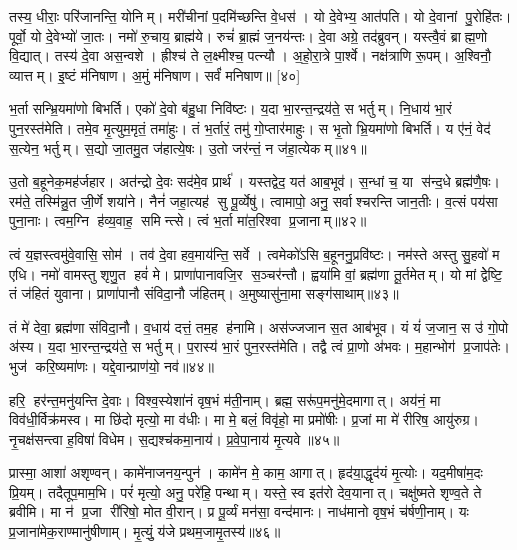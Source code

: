 तस्य॒ धीराः॒ परि॑जानन्ति॒ योनिम्। मरी॑चीनां प॒दमि॑च्छन्ति वे॒धस॑। यो दे॒वेभ्य॒ आत॑पति। यो दे॒वानां पु॒रोहि॑तः। पूर्वो॒ यो दे॒वेभ्यो॑ जा॒तः। नमो॑ रु॒चाय॒ ब्राह्म॑ये। रुचं॑ ब्रा॒ह्मं ज॒नय॑न्तः। दे॒वा अग्रे॒ तद॑ब्रुवन्। यस्त्वै॒वं ब्राह्म॒णो वि॒द्यात्। तस्य॑ दे॒वा अस॒न्वशे। ह्रीश्च॑ ते ल॒क्ष्मीश्च॒ पत्न्यौ। अ॒हो॒रा॒त्रे पा॒र्श्वे। नक्ष॑त्राणि रू॒पम्। अ॒श्विनौ॒ व्यात्तम्। इ॒ष्टं म॑निषाण। अ॒मुं म॑निषाण। सर्वं॑ मनिषाण॥ [४०]
\anuvakamend[जा॒य॒ते॒ वशे॑ स॒प्त च॑]

भ॒र्ता सन्भ्रि॒यमा॑णो बिभर्ति। एको॑ दे॒वो ब॑हु॒धा निवि॑ष्टः। य॒दा भा॒रन्त॒न्द्रय॑ते॒ स भर्तुम्। नि॒धाय॑ भा॒रं पुन॒रस्त॑मेति। तमे॒व मृ॒त्युम॒मृतं॒ तमा॑हुः। तं भ॒र्तारं॒ तमु॑ गो॒प्तार॑माहुः। स भृ॒तो भ्रि॒यमा॑णो बिभर्ति। य ए॑नं॒ वेद॑ स॒त्येन॒ भर्तुम्। स॒द्यो जा॒तमु॒त ज॑हात्ये॒षः। उ॒तो जर॑न्तं॒ न ज॑हा॒त्येकम्॥४१॥

उ॒तो ब॒हूनेक॒मह॑र्जहार। अत॑न्द्रो दे॒वः सद॑मे॒व प्रार्थ॑। यस्तद्वेद॒ यत॑ आब॒भूव॑। स॒न्धां च॒ या स॑न्द॒धे ब्रह्म॑णै॒षः। रम॑ते॒ तस्मि॑न्नु॒त जी॒र्णे शया॑ने। नैनं॑ जहा॒त्यह॑ सु पू॒र्व्येषु॑। त्वामापो॒ अनु॒ सर्वाश्चरन्ति जान॒तीः। व॒त्सं पय॑सा पुना॒नाः। त्वम॒ग्नि ह॑व्य॒वाह॒ समिन्त्से। त्वं भ॒र्ता मा॑त॒रिश्वा प्र॒जानाम्॥४२॥

त्वं य॒ज्ञस्त्वमु॑वे॒वासि॒ सोम॑। तव॑ दे॒वा हव॒माय॑न्ति॒ सर्वे। त्वमेको॑ऽसि ब॒हूननु॒प्रवि॑ष्टः। नम॑स्ते अस्तु सु॒हवो॑ म एधि। नमो॑ वामस्तु शृणु॒त हवं॑ मे। प्राणा॑पानावजि॒र स॒ञ्चर॑न्तौ। ह्वया॑मि वां॒ ब्रह्म॑णा तू॒र्तमेतम्। यो मां द्वेेष्टि॒ तं ज॑हितं युवाना। प्राणा॑पानौ संविदा॒नौ ज॑हितम्। अ॒मुष्यासु॑ना॒मा सङ्ग॑साथाम्॥४३॥

तं मे॑ देवा॒ ब्रह्म॑णा संविदा॒नौ। व॒धाय॑ दत्तं॒ तम॒ह ह॑नामि। अस॑ज्जजान स॒त आब॑भूव। यं यं॑ ज॒जान॒ स उ॑ गो॒पो अ॑स्य। य॒दा भा॒रन्त॒न्द्रय॑ते॒ स भर्तुम्। प॒रास्य॑ भा॒रं पुन॒रस्त॑मेति। तद्वै त्वं प्रा॒णो अ॑भवः। म॒हान्भोग॑ प्र॒जाप॑तेः। भुज॑ करि॒ष्यमा॑णः। यद्दे॒वान्प्राण॑यो॒ नव॑॥४४॥
\anuvakamend[एकं॑ प्र॒जानाङ्गसाथां॒ नव॑]

हरि॒ हर॑न्त॒मनु॑यन्ति दे॒वाः। विश्व॒स्येशा॑नं वृष॒भं म॑ती॒नाम्। ब्रह्म॒ सरू॑प॒मनु॑मे॒दमागात्। अय॑नं॒ मा विव॑धी॒र्विक्र॑मस्व। मा छि॑दो मृत्यो॒ मा व॑धीः। मा मे॒ बलं॒  विवृ॑हो॒ मा प्रमो॑षीः। प्र॒जां मा मे॑ रीरिष॒ आयु॑रुग्र। नृ॒चक्ष॑सन्त्वा ह॒विषा॑ विधेम। स॒द्यश्च॑कमा॒नाय॑। प्र॒वे॒पा॒नाय॑ मृ॒त्यवे॥४५॥

प्रास्मा॒ आशा॑ अशृण्वन्। कामे॑नाजनय॒न्पुन॑। कामे॑न मे॒ काम॒ आगात्। हृद॑या॒द्धृद॑यं मृ॒त्योः। यद॒मीषा॑म॒दः प्रि॒यम्। तदैतूप॒माम॒भि। परं॑ मृत्यो॒ अनु॒ परे॑हि॒ पन्थाम्। यस्ते॒ स्व इत॑रो देव॒यानात्। चक्षु॑ष्मते शृण्व॒ते ते ब्रवीमि। मा न॑ प्र॒जा री॑रिषो॒ मोत वी॒रान्। प्र पू॒र्व्यं मन॑सा॒ वन्द॑मानः। नाध॑मानो वृष॒भं च॑र्\mbox{}षणी॒नाम्। यः प्र॒जाना॑मेक॒राण्मानु॑षीणाम्। मृ॒त्युं॒ य॑जे प्रथम॒जामृ॒तस्य॑॥४६॥
\anuvakamend[मृ॒त्यवे॑ वी॒राश्च॒त्वारि॑ च]

